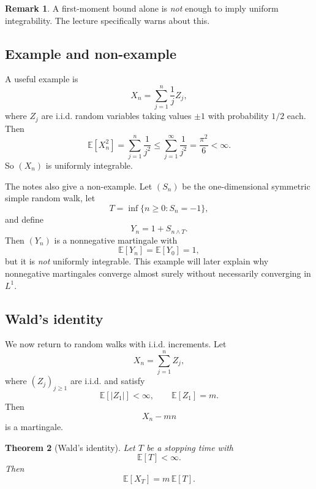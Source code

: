 \documentclass[11pt]{article}
\newtheorem{theorem}{Theorem}[section]
\theoremstyle{definition}
\newtheorem{remark}[theorem]{Remark}
\begin{document}
\begin{remark}
A first-moment bound alone is \emph{not} enough to imply uniform integrability. The lecture specifically warns about this.
\end{remark}

\subsection{Example and non-example}

A useful example is
\[
X_n=\sum_{j=1}^n \frac{1}{j}Z_j,
\]
where \(Z_j\) are i.i.d. random variables taking values \(\pm 1\) with probability \(1/2\) each. Then
\[
\mathbb E[X_n^2]=\sum_{j=1}^n \frac{1}{j^2}
\le
\sum_{j=1}^{\infty}\frac{1}{j^2}
=
\frac{\pi^2}{6}<\infty.
\]
So \((X_n)\) is uniformly integrable.

The notes also give a non-example. Let \((S_n)\) be the one-dimensional symmetric simple random walk, let
\[
T=\inf\{n\ge 0:S_n=-1\},
\]
and define
\[
Y_n=1+S_{n\wedge T}.
\]
Then \((Y_n)\) is a nonnegative martingale with
\[
\mathbb E[Y_n]=\mathbb E[Y_0]=1,
\]
but it is \emph{not} uniformly integrable. This example will later explain why nonnegative martingales converge almost surely without necessarily converging in \(L^1\).

\subsection{Wald's identity}

We now return to random walks with i.i.d. increments. Let
\[
X_n=\sum_{j=1}^n Z_j,
\]
where \((Z_j)_{j\ge 1}\) are i.i.d. and satisfy
\[
\mathbb E[|Z_1|]<\infty,
\qquad
\mathbb E[Z_1]=m.
\]
Then
\[
X_n-mn
\]
is a martingale.

\begin{theorem}[Wald's identity]
Let \(T\) be a stopping time with
\[
\mathbb E[T]<\infty.
\]
Then
\[
\mathbb E[X_T]=m\,\mathbb E[T].
\]
\end{theorem}
\end{document}
